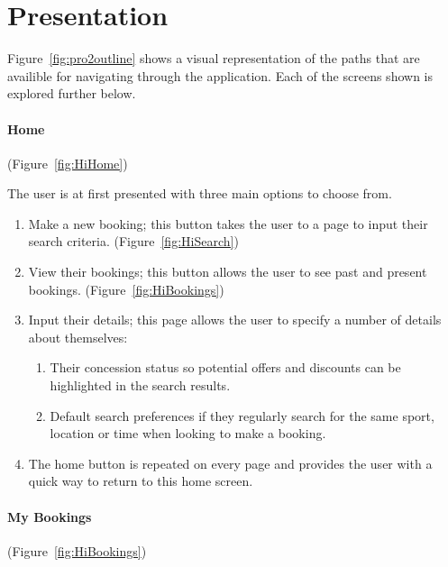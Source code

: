 \section{Presentation}

Figure~\ref{fig:pro2outline} shows a visual representation of the paths that
are availible for navigating through the application. Each of the screens shown
is explored further below.

\paragraph{Home} (Figure~\ref{fig:HiHome})


The user is at first presented with three main options to choose from.
\begin{enumerate}
	\item Make a new booking; this button takes the user to a page to input
		their search criteria. (Figure~\ref{fig:HiSearch})
	\item View their bookings; this button allows the user to see past and
		present bookings. (Figure~\ref{fig:HiBookings})
	\item Input their details; this page allows the user to specify a number
		of details about themselves:

		\begin{enumerate}
			\item Their concession status so potential offers and
				discounts can be highlighted in the search results.
			\item Default search preferences if they regularly search for the
				same sport, location or time when looking to make a booking.
		\end{enumerate}
	\item The home button is repeated on every page and provides the user with
		a quick way to return to this home screen.
\end{enumerate}

\paragraph{My Bookings} (Figure~\ref{fig:HiBookings})


